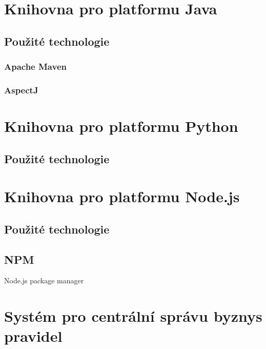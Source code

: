 \section{Knihovna pro platformu Java}

\subsection{Použité technologie}

\subsubsection{Apache Maven}

\subsubsection{AspectJ}

\section{Knihovna pro platformu Python}

\subsection{Použité technologie}

\subsection{}

\section{Knihovna pro platformu Node.js}


\subsection{Použité technologie}

\subsection{NPM}

Node.js package manager

\section{Systém pro centrální správu byznys pravidel}

